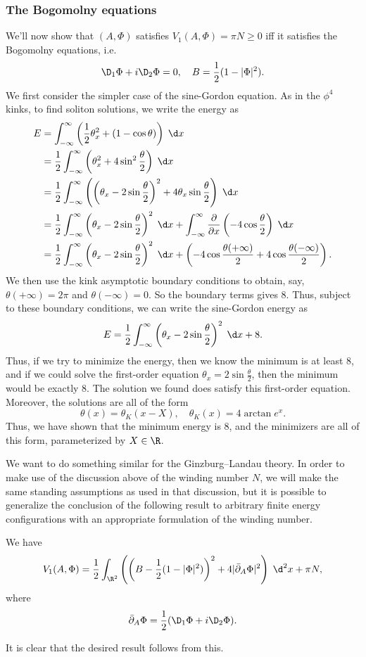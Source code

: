 \documentclass[a4paper]{article}
\begin{document}
\subsubsection*{The Bogomolny equations}
We'll now show that $(A, \Phi)$ satisfies $V_1(A, \Phi) = \pi N \geq 0$ iff it satisfies the Bogomolny equations, i.e.
\[
  \D_1 \Phi + i \D_2 \Phi = 0,\quad B = \frac{1}{2} (1 - |\Phi|^2).
\]
We first consider the simpler case of the sine-Gordon equation. As in the $\phi^4$ kinks, to find soliton solutions, we write the energy as
\begin{align*}
  E &= \int_{-\infty}^\infty \left(\frac{1}{2} \theta_x^2 + (1 - \cos \theta)\right) \;\d x \\
  &= \frac{1}{2} \int_{-\infty}^\infty \left(\theta_x^2 + 4 \sin^2 \frac{\theta}{2}\right) \;\d x\\
  &= \frac{1}{2} \int_{-\infty}^\infty \left(\left(\theta_x - 2 \sin \frac{\theta}{2}\right)^2 + 4 \theta_x \sin \frac{\theta}{2}\right)\;\d x\\
  &= \frac{1}{2} \int_{-\infty}^\infty \left(\theta_x - 2 \sin \frac{\theta}{2}\right)^2\;\d x + \int_{-\infty}^\infty \frac{\partial}{\partial x}\left(-4 \cos \frac{\theta}{2}\right)\;\d x\\
  &= \frac{1}{2}\int_{-\infty}^\infty \left(\theta_x - 2 \sin \frac{\theta}{2}\right)^2\;\d x + \left(-4\cos \frac{\theta(+\infty)}{2} + 4 \cos \frac{\theta(-\infty)}{2}\right).
\end{align*}
We then use the kink asymptotic boundary conditions to obtain, say, $\theta(+\infty) = 2\pi$ and $\theta(-\infty) = 0$. So the boundary terms gives $8$. Thus, subject to these boundary conditions, we can write the sine-Gordon energy as
\[
  E = \frac{1}{2}\int_{-\infty}^\infty \left(\theta_x - 2 \sin \frac{\theta}{2}\right)^2\;\d x + 8.
\]
Thus, if we try to minimize the energy, then we know the minimum is at least $8$, and if we could solve the first-order equation $\theta_x = 2 \sin \frac{\theta}{2}$, then the minimum would be exactly $8$. The solution we found does satisfy this first-order equation. Moreover, the solutions are all of the form
\[
  \theta(x) = \theta_K(x - X),\quad \theta_K(x) = 4 \arctan e^x.
\]
Thus, we have shown that the minimum energy is $8$, and the minimizers are all of this form, parameterized by $X \in \R$.

We want to do something similar for the Ginzburg--Landau theory. In order to make use of the discussion above of the winding number $N$, we will make the same standing assumptions as used in that discussion, but it is possible to generalize the conclusion of the following result to arbitrary finite energy configurations with an appropriate formulation of the winding number.
\begin{lemma}
  We have
  \[
    V_1(A, \Phi) = \frac{1}{2} \int_{\R^2} \left(\left(B - \frac{1}{2}(1 - |\Phi|^2)\right)^2 + 4 |\bar{\partial}_A \Phi|^2\right)\;\d^2 x + \pi N,
  \]
  where
  \[
    \bar{\partial}_A \Phi = \frac{1}{2} (\D_1 \Phi + i \D_2 \Phi).
  \]
\end{lemma}
It is clear that the desired result follows from this.
\end{document}
